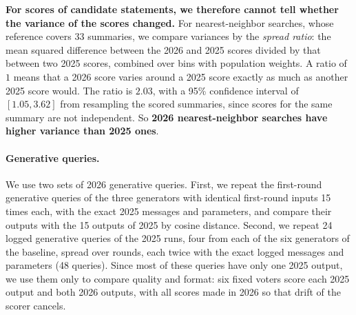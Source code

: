 \documentclass[letterpaper]{article} %
\begin{document}
\textbf{For scores of candidate statements, we therefore cannot tell whether the variance of the scores changed.}
For nearest-neighbor searches, whose reference covers 33 summaries, we compare variances by the \emph{spread ratio}: the mean squared difference between the 2026 and 2025 scores divided by that between two 2025 scores, combined over bins with population weights.
A ratio of \(1\) means that a 2026 score varies around a 2025 score exactly as much as another 2025 score would.
The ratio is \(2.03\), with a 95\% confidence interval of \([1.05, 3.62]\) from resampling the scored summaries, since scores for the same summary are not independent.
So \textbf{2026 nearest-neighbor searches have higher variance than 2025 ones}.

\paragraph{Generative queries.}
We use two sets of 2026 generative queries.
First, we repeat the first-round generative queries of the three generators with identical first-round inputs 15 times each, with the exact 2025 messages and parameters, and compare their outputs with the 15 outputs of 2025 by cosine distance.
Second, we repeat 24 logged generative queries of the 2025 runs, four from each of the six generators of the baseline, spread over rounds, each twice with the exact logged messages and parameters (48 queries).
Since most of these queries have only one 2025 output, we use them only to compare quality and format: six fixed voters score each 2025 output and both 2026 outputs, with all scores made in 2026 so that drift of the scorer cancels.
\end{document}
